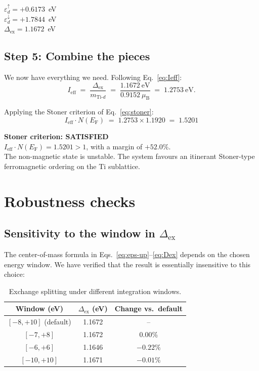\documentclass[11pt,a4paper]{article}
\newcommand{\Ef}{E_{\mathrm{F}}}
\newcommand{\Tid}{\text{Ti-}d}
\newcommand{\Dex}{\Delta_{\text{ex}}}
\newcommand{\Ieff}{I_{\text{eff}}}
\newcommand{\NEf}{N(\Ef)}
\begin{document}
\begin{resultbox}
$\varepsilon^{\uparrow}_{d} = +0.6173$~eV \\
$\varepsilon^{\downarrow}_{d} = +1.7844$~eV \\
$\Dex = 1.1672$~eV
\end{resultbox}

\subsection{Step 5: Combine the pieces}

We now have everything we need. Following
Eq.~\eqref{eq:Ieff}:
%
\begin{equation}
    \Ieff
    \;=\; \frac{\Dex}{m_{\Tid}}
    \;=\; \frac{1.1672~\text{eV}}{0.9152~\mu_{\text{B}}}
    \;=\; 1.2753~\text{eV}.
\end{equation}

Applying the Stoner criterion of Eq.~\eqref{eq:stoner}:
%
\begin{equation}
    \boxed{\,
    \Ieff \cdot \NEf
    \;=\; 1.2753 \times 1.1920
    \;=\; 1.5201
    \,}
    \label{eq:final}
\end{equation}

\begin{resultbox}
\textbf{Stoner criterion: SATISFIED}\\[2pt]
$\Ieff \cdot \NEf = 1.5201 > 1$, with a margin of $+52.0\%$.\\[2pt]
The non-magnetic state is unstable. The system favours an itinerant
Stoner-type ferromagnetic ordering on the Ti sublattice.
\end{resultbox}

\section{Robustness checks}

\subsection{Sensitivity to the window in $\Dex$}

The center-of-mass formula in
Eqs.~\eqref{eq:eps-up}--\eqref{eq:Dex} depends on the chosen energy
window. We have verified that the result is essentially insensitive to
this choice:
%
\begin{table}[h!]
\centering
\begin{tabular}{c c c}
\toprule
Window (eV)      & $\Dex$ (eV)   & Change vs.\ default \\
\midrule
$[-8, +10]$ (default) & 1.1672 & --        \\
$[-7, +8]$            & 1.1672 & 0.00\%    \\
$[-6, +6]$            & 1.1646 & $-0.22\%$ \\
$[-10, +10]$          & 1.1671 & $-0.01\%$ \\
\bottomrule
\end{tabular}
\caption{Exchange splitting under different integration windows.}
\end{table}
\end{document}
